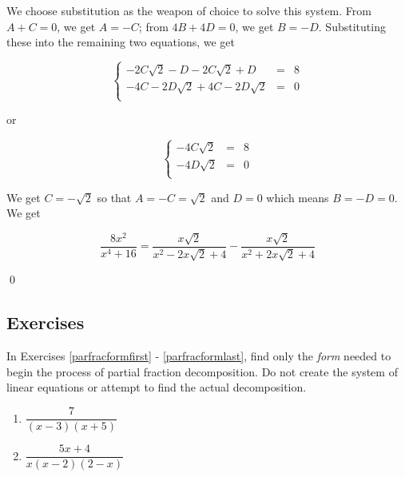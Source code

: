 \begin{ex}
\begin{enumerate}
We choose substitution as the weapon of choice to solve this system.   From $A+C = 0$, we get $A = -C$;  from $4B + 4D = 0$, we get $B = -D$.  Substituting these into the remaining two equations, we get

\[ \left\{ \begin{array}{rcr}  -2C\sqrt{2} -D - 2C\sqrt{2}+D & = & 8 \\ -4C - 2D\sqrt{2}+4C - 2D\sqrt{2} & = & 0 \\ \end{array} \right.\] 

or 

\[ \left\{ \begin{array}{rcr}  -4C\sqrt{2}& = & 8 \\ -4D\sqrt{2} & = & 0 \\ \end{array} \right.\] 

We get $C = -\sqrt{2}$ so that $A = -C = \sqrt{2}$ and $D = 0$ which means $B = -D = 0$.  We get

\[ \dfrac{8x^2}{x^4+16} = \dfrac{x\sqrt{2}}{x^2 - 2x\sqrt{2} + 4} - \dfrac{x\sqrt{2}}{x^2 + 2x\sqrt{2} + 4}\]

\qed

\end{enumerate}

\end{ex}

\newpage

\subsection{Exercises}



In Exercises \ref{parfracformfirst} - \ref{parfracformlast},  find only the \emph{form} needed to begin the process of partial fraction decomposition.  Do not create the system of linear equations or attempt to find the actual decomposition.

\begin{multicols}{2}
\begin{enumerate}

\item $\dfrac{7}{(x - 3)(x + 5)}$ \label{parfracformfirst}
\item $\dfrac{5x + 4}{x(x - 2)(2 - x)}$

\setcounter{HW}{\value{enumi}}
\end{enumerate}
\end{multicols}


